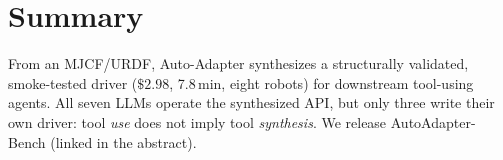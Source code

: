 \section{Summary}
\label{sec:summary}

From an MJCF/URDF, Auto-Adapter synthesizes a structurally
validated, smoke-tested driver ($\$2.98$, 7.8\,min, eight robots)
for downstream tool-using agents. All seven LLMs operate the synthesized API, but only
three write their own driver: tool \emph{use} does not imply tool
\emph{synthesis}. We release AutoAdapter-Bench (linked in the
abstract).

